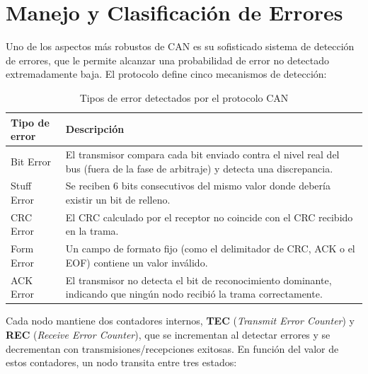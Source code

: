 \documentclass[pdflatex,sn-mathphys-num]{sn-jnl}%
\begin{document}
\section{Manejo y Clasificación de Errores}\label{sec:errors}
Uno de los aspectos más robustos de CAN es su sofisticado sistema de detección de errores, que le permite alcanzar una probabilidad de error no detectado extremadamente baja. El protocolo define cinco mecanismos de detección:

\begin{table}[!h]
\centering
\caption{Tipos de error detectados por el protocolo CAN}
\label{tab:error_types}
\begin{tabular}{|l|p{7.5cm}|}
\hline
\textbf{Tipo de error} & \textbf{Descripción} \\ \hline
Bit Error & El transmisor compara cada bit enviado contra el nivel real del bus (fuera de la fase de arbitraje) y detecta una discrepancia. \\ \hline
Stuff Error & Se reciben 6 bits consecutivos del mismo valor donde debería existir un bit de relleno. \\ \hline
CRC Error & El CRC calculado por el receptor no coincide con el CRC recibido en la trama. \\ \hline
Form Error & Un campo de formato fijo (como el delimitador de CRC, ACK o el EOF) contiene un valor inválido. \\ \hline
ACK Error & El transmisor no detecta el bit de reconocimiento dominante, indicando que ningún nodo recibió la trama correctamente. \\ \hline
\end{tabular}
\end{table}

Cada nodo mantiene dos contadores internos, \textbf{TEC} (\textit{Transmit Error Counter}) y \textbf{REC} (\textit{Receive Error Counter}), que se incrementan al detectar errores y se decrementan con transmisiones/recepciones exitosas. En función del valor de estos contadores, un nodo transita entre tres estados:
\end{document}
